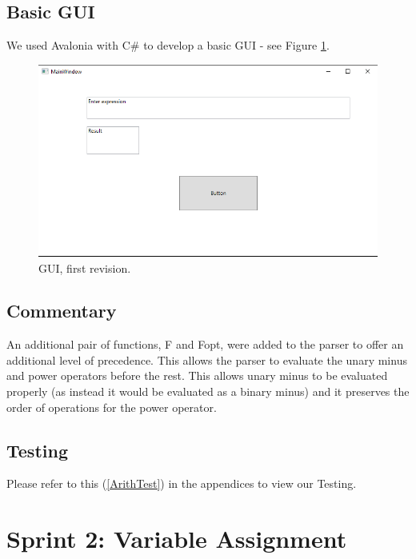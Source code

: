 \documentclass[a4paper, oneside, 11pt]{report}
\begin{document}
\subsection{Basic GUI}
We used Avalonia with C\# to develop a basic GUI - see Figure \ref{gui01}.
\begin{figure}[htb]
\begin{center}

\includegraphics[width=0.9 \columnwidth]{GUI_01}

\caption{GUI, first revision.}
\label{gui01}
\end{center}
\end{figure}

\subsection{Commentary}
An additional pair of functions, F and Fopt, were added to the parser to offer an additional level of precedence. This allows the parser to evaluate the unary minus and power operators before the rest. This allows unary minus to be evaluated properly (as instead it would be evaluated as a binary minus) and it preserves the order of operations for the power operator. 

\subsection{Testing}
Please refer to this (\ref{ArithTest}) in the appendices to view our Testing. \\
\clearpage
\section{Sprint 2: Variable Assignment}
\end{document}
